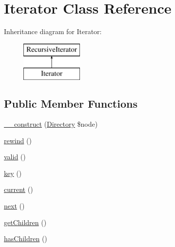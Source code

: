 \hypertarget{class_sebastian_bergmann_1_1_code_coverage_1_1_node_1_1_iterator}{}\section{Iterator Class Reference}
\label{class_sebastian_bergmann_1_1_code_coverage_1_1_node_1_1_iterator}
Inheritance diagram for Iterator\+:\begin{figure}[H]
\begin{center}
\leavevmode
\includegraphics[height=2.000000cm]{class_sebastian_bergmann_1_1_code_coverage_1_1_node_1_1_iterator}
\end{center}
\end{figure}
\subsection*{Public Member Functions}
\begin{DoxyCompactItemize}
\item 
\mbox{\hyperlink{class_sebastian_bergmann_1_1_code_coverage_1_1_node_1_1_iterator_a5e712930fe45273a89c4a93532ef00d3}{\+\_\+\+\_\+construct}} (\mbox{\hyperlink{class_sebastian_bergmann_1_1_code_coverage_1_1_node_1_1_directory}{Directory}} \$node)
\item 
\mbox{\hyperlink{class_sebastian_bergmann_1_1_code_coverage_1_1_node_1_1_iterator_ae619dcf2218c21549cb65d875bbc6c9c}{rewind}} ()
\item 
\mbox{\hyperlink{class_sebastian_bergmann_1_1_code_coverage_1_1_node_1_1_iterator_abb9f0d6adf1eb9b3b55712056861a247}{valid}} ()
\item 
\mbox{\hyperlink{class_sebastian_bergmann_1_1_code_coverage_1_1_node_1_1_iterator_a729e946b4ef600e71740113c6d4332c0}{key}} ()
\item 
\mbox{\hyperlink{class_sebastian_bergmann_1_1_code_coverage_1_1_node_1_1_iterator_af343507d1926e6ecf964625d41db528c}{current}} ()
\item 
\mbox{\hyperlink{class_sebastian_bergmann_1_1_code_coverage_1_1_node_1_1_iterator_acea62048bfee7b3cd80ed446c86fb78a}{next}} ()
\item 
\mbox{\hyperlink{class_sebastian_bergmann_1_1_code_coverage_1_1_node_1_1_iterator_a8650a4f6150ed357d88fa043f1685ac5}{get\+Children}} ()
\item 
\mbox{\hyperlink{class_sebastian_bergmann_1_1_code_coverage_1_1_node_1_1_iterator_a1332d27ba1ecefa899e393e83309735e}{has\+Children}} ()
\end{DoxyCompactItemize}



